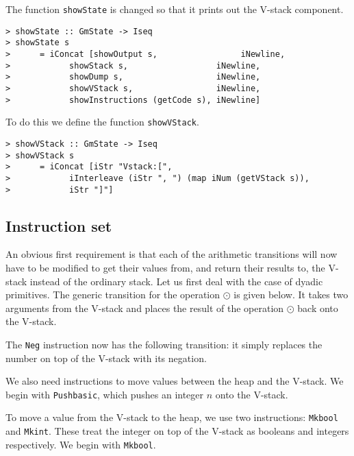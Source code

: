 The function \mbox{\tt showState} is changed so that it prints out the V-stack
component.
\begin{verbatim}
> showState :: GmState -> Iseq
> showState s
>      = iConcat [showOutput s,                 iNewline,
>            showStack s,                  iNewline,
>            showDump s,                   iNewline,
>            showVStack s,                 iNewline,
>            showInstructions (getCode s), iNewline]
\end{verbatim}
%
%
To do this we define the function \mbox{\tt showVStack}.
\begin{verbatim}
> showVStack :: GmState -> Iseq
> showVStack s
>      = iConcat [iStr "Vstack:[",
>            iInterleave (iStr ", ") (map iNum (getVStack s)),
>            iStr "]"]
\end{verbatim}
%
%
\subsection{Instruction set}

An obvious first requirement is that each of the arithmetic
transitions will now have to be modified to get their values from, and
return their results to, the V-stack instead of the ordinary stack.
Let us first deal with the case of dyadic primitives. The generic
transition for the operation $\odot$ is given below. It takes two
arguments from the V-stack and places the result of the operation
$\odot$ back onto the V-stack.

\gmruleodv%
{}%
{}

The \mbox{\tt Neg} instruction now has the following transition: it simply
replaces the number on top of the V-stack with its negation.

\gmruleodv%
{}%
{}
%
We also need instructions to move values between the heap and the
V-stack. We begin with \mbox{\tt Pushbasic}, which pushes an integer $n$ onto
the V-stack.

\gmruleodv%
{}%
{}

To move a value from the V-stack to the heap, we use two instructions:
\mbox{\tt Mkbool} and \mbox{\tt Mkint}. These treat the integer on top of the V-stack as
booleans and integers respectively. We begin with \mbox{\tt Mkbool}.

